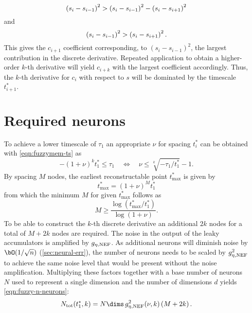 \begin{equation}
    \del{s_i - s_{i-1}}^2 > \del{s_i - s_{i-1}}^2 - \del{s_i - s_{i+1}}^2
\end{equation}
and
\begin{equation}
    \del{s_i - s_{i-1}}^2 > \del{s_i - s_{i+1}}^2 \text{.}
\end{equation}
This gives the $c_{i+1}$ coefficient corresponding, to $(s_i - s_{i-1})^2$, the largest contribution in the discrete derivative.  %
Repeated application to obtain a higher-order $k$-th derivative will yield $c_{i+k}$ with the largest coefficient accordingly.
Thus, the $k$-th derivative for $c_i$ with respect to $s$ will be dominated by the timescale $t^*_{i+1}$.


\section{Required neurons}\label{apdx:fuzzymem-neurons}
To achieve a lower timescale of $\tau_1$ an appropriate $\nu$ for spacing $t^*_i$ can be obtained with \cref{eqn:fuzzymem-ts} as
\begin{equation}
    -{(1+\nu)}^k t^*_1 \leq \tau_1 \quad\Leftrightarrow\quad \nu \leq \sqrt[k]{-\tau_1 / t^*_1} - 1 \text{.}
\end{equation}
By spacing $M$ nodes, the earliest reconstructable point $t^*_{\max}$ is given by
\begin{equation}
    t^*_{\max} = {(1+\nu)}^M t^*_1
\end{equation}
from which the minimum $M$ for given $t^*_{\max}$ follows as
\begin{equation}
    M \geq \frac{\log(t^*_{\max} / t^*_1)}{\log(1+\nu)} \text{.}
\end{equation}
To be able to construct the $k$-th discrete derivative an additional $2k$ nodes for a total of $M + 2k$ nodes are required.
The noise in the output of the leaky accumulators is amplified by $g_{\eta,{\mathrm{NEF}}}$.
As additional neurons will diminish noise by $\bO(1/\sqrt{n})$ (\cref{sec:neural-err}), the number of neurons needs to be scaled by $g_{\eta,{\mathrm{NEF}}}^2$ to achieve the same noise level that would be present without the noise amplification.
Multiplying these factors together with a base number of neurons $N$ used to represent a single dimension and the number of dimensions $d$ yields \cref{eqn:fuzzy-n-neurons}:
\begin{equation*}
    N_{\ped{tot}}(t^*_1, k) = N \dims\, g_{\eta,\ped{NEF}}^2(\nu, k) \del{M + 2k} \text{.}
\end{equation*}
